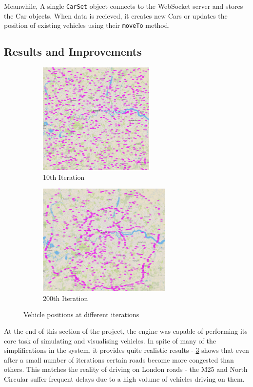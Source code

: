 \documentclass[ %
                    author={Alexander Hill},
                supervisor={Dr. Benjamin Sach},
                    degree={MEng},
                     title={MARMOSET: Multi Agent Real-time Multi-core Online
                     Simulation for Efficient Transportation},
                  subtitle={},
                      type={research},
                      year={2016} ]{dissertation}
\begin{document}
Meanwhile, A single \texttt{CarSet} object connects to the WebSocket server and stores the
Car objects. When data is recieved, it creates new Cars or updates the
position of existing vehicles using their \texttt{moveTo} method.

\subsection{Results and Improvements}

\begin{figure}[h]
\centering
\begin{subfigure}[b]{0.4\textwidth}
    \centering
    \includegraphics[height=15em]{init-start}
    \caption{10th Iteration}\label{fig:init-start}
\end{subfigure}
\hspace{2em}
\begin{subfigure}[b]{0.4\textwidth}
    \centering
    \includegraphics[height=15em]{init-200}
    \caption{200th Iteration}\label{fig:init-200}
\end{subfigure}
\caption{Vehicle positions at different iterations}
\end{figure}

At the end of this section of the project, the engine was capable of performing
its core task of simulating and visualising vehicles. In spite of many of the
simplifications in the system, it provides quite realistic results -
\ref{fig:init-200} shows that even after a small number of iterations certain roads
become more congested than others. This matches the reality of driving on London
roads - the M25 and North Circular suffer frequent delays due to a high volume
of vehicles driving on them.
\end{document}
